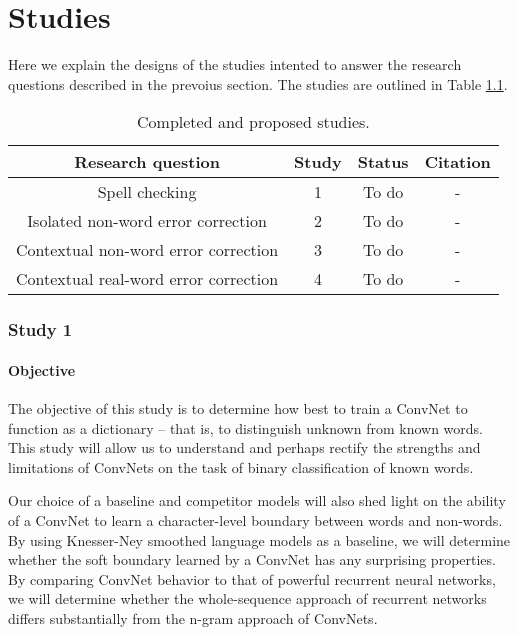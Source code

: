 \chapter{Studies}
\label{sec:studies}

Here we explain the designs of the studies intented to answer the research
questions described in the prevoius section.  The studies are outlined
in Table \ref{tab:studies}.


\begin{table}
\centering
\begin{tabular}{c|c|c|c} 
\hline
Research question & Study & Status & Citation \\
\hline
\parbox{7cm}{Spell checking} & 1 & To do& - \\
\hline
\parbox{7cm}{Isolated non-word error correction} & 2 & To do & - \\
\hline
\parbox{7cm}{Contextual non-word error correction} & 3 & To do & - \\
\hline
\parbox{7cm}{Contextual real-word error correction}& 4 & To do & - \\
\hline
\end{tabular}
\caption{Completed and proposed studies.}
\label{tab:studies}
\end{table}

\subsection{Study 1}
\label{sec:study1}
\subsubsection{Objective}

The objective of this study is to determine how best to train a ConvNet to function as a dictionary -- that is, to distinguish unknown from known words.  This study will allow us to understand and perhaps rectify the strengths and limitations of ConvNets on the task of binary classification of known words.

Our choice of a baseline and competitor models will also shed light on the ability of a ConvNet to learn a character-level boundary between words and non-words.  By using Knesser-Ney smoothed language models as a baseline, we will determine whether the soft boundary learned by a ConvNet has any surprising properties.  By comparing ConvNet behavior to that of powerful recurrent neural networks, we will determine whether the whole-sequence approach of recurrent networks differs substantially from the n-gram approach of ConvNets.

